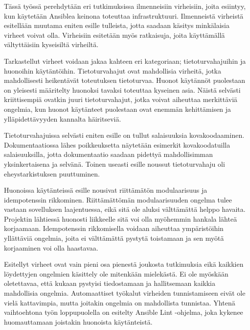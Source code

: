 Tässä työssä perehdytään eri tutkimuksissa ilmenneisiin virheisiin, joita
esiintyy, kun käytetään Ansiblea keinona toteuttaa infrastruktuuri.
Ilmenneistä virheistä esitellään muutama eniten esille tulleista, jotta
saadaan käsitys minkälaisia virheet voivat olla. Virheisiin esitetään
myös ratkaisuja, joita käyttämällä vältyttäisiin kyseisiltä virheiltä.

Tarkastellut virheet voidaan jakaa kahteen eri kategoriaan; tietoturvahajuihin
ja huonoihin käytäntöihin. Tietoturvahajut ovat mahdollisia virheitä, jotka
mahdollisesti heikentävät toteutuksen tietoturvaa. Huonot käytännöt puolestaan
on yleisesti määritelty huonoksi tavaksi toteuttaa kyseinen asia. Näistä
selvästi kriittisempiä ovatkin juuri tietoturvahajut, jotka voivat aiheuttaa
merkittäviä ongelmia, kun huonot käytänteet puolestaan ovat enemmän
kehittämisen ja ylläpidettävyyden kannalta häiritseviä.

Tietoturvahajuissa selvästi eniten esille on tullut salaisuuksia
kovakoodaaminen. Dokumentaatiossa lähes poikkeuksetta näytetään esimerkit
kovakoodatuilla salaisuuksilla, jotta dokumentaatio saadaan pidettyä
mahdollisimman yksinkertaisena ja selvänä. Toinen useasti esille noussut
tietoturvahaju oli eheystarkistuksen puuttuminen.

Huonoissa käytänteissä esille nousivat riittämätön modulaarisuus ja
idempotenssin rikkominen. Riittämättömän modulaarisuuden ongelma tulee vastaan
sovelluksen laajentuessa, eikä sitä ole aluksi välttämättä helppo havaita.
Projektin lähtiessä huonosti liikkeelle sitä voi olla myöhemmin hankala lähteä
korjaamaan. Idempotenssin rikkomisella voidaan aiheuttaa ympäristöihin
yllättäviä ongelmia, joita ei välttämättä pystytä toistamaan ja sen myötä
korjaaminen voi olla haastavaa.

Esitellyt virheet ovat vain pieni osa pienestä joukosta tutkimuksia eikä
kaikkien löydettyjen ongelmien käsittely ole mitenkään mielekästä. Ei ole
myöskään oletettavaa, että kukaan pystyisi tiedostamaan ja hallitsemaan
kaikkia mahdollisia ongelmia. Automaattiset työkalut virheiden tunnistamiseen
eivät ole vielä kattavimpia, mutta joitakin ongelmia on mahdollista tunnistaa.
Yhtenä vaihtoehtona työn loppupuolella on esitelty Ansible Lint -ohjelma, joka
kykenee huomauttamaan joistakin huonoista käytänteistä.
